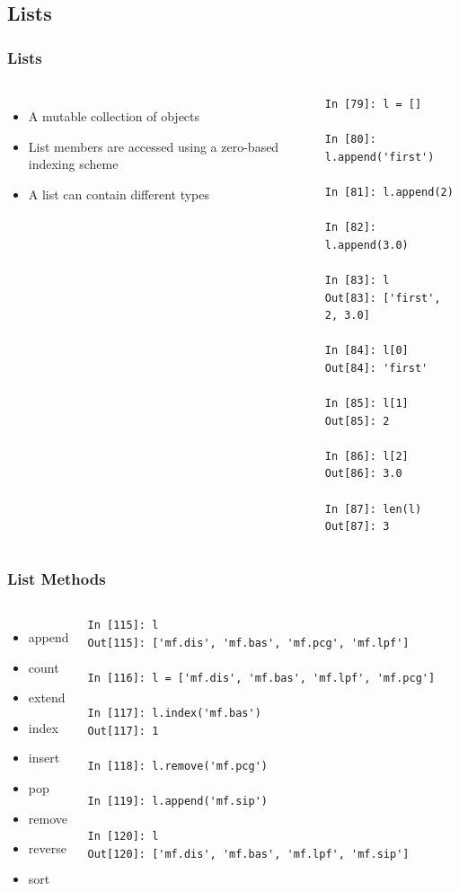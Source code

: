 \documentclass{beamer}
\begin{document}
\subsection{Lists}
\begin{frame}[fragile]
\frametitle{Lists}
\begin{columns}[c]
\column{2.5in}
\begin{itemize}
\item{A mutable collection of objects}
\item{List members are accessed using a zero-based indexing scheme}
\item{A list can contain different types}
\end{itemize}

\column{2.5in}
\tiny
\begin{lstlisting}
In [79]: l = []

In [80]: l.append('first')

In [81]: l.append(2)

In [82]: l.append(3.0)

In [83]: l
Out[83]: ['first', 2, 3.0]

In [84]: l[0]
Out[84]: 'first'

In [85]: l[1]
Out[85]: 2

In [86]: l[2]
Out[86]: 3.0

In [87]: len(l)
Out[87]: 3
\end{lstlisting}
\end{columns}
\end{frame}

\begin{frame}[fragile]
\frametitle{List Methods}
\begin{columns}[c]
\column{2.5in}
\begin{itemize}
\item{append}
\item{count}
\item{extend}
\item{index}
\item{insert}
\item{pop}
\item{remove}
\item{reverse}
\item{sort}
\end{itemize}

\column{2.5in}
\begin{lstlisting}
In [115]: l
Out[115]: ['mf.dis', 'mf.bas', 'mf.pcg', 'mf.lpf']

In [116]: l = ['mf.dis', 'mf.bas', 'mf.lpf', 'mf.pcg']

In [117]: l.index('mf.bas')
Out[117]: 1

In [118]: l.remove('mf.pcg')

In [119]: l.append('mf.sip')

In [120]: l
Out[120]: ['mf.dis', 'mf.bas', 'mf.lpf', 'mf.sip']
\end{lstlisting}
\end{columns}
\end{frame}
\end{document}
